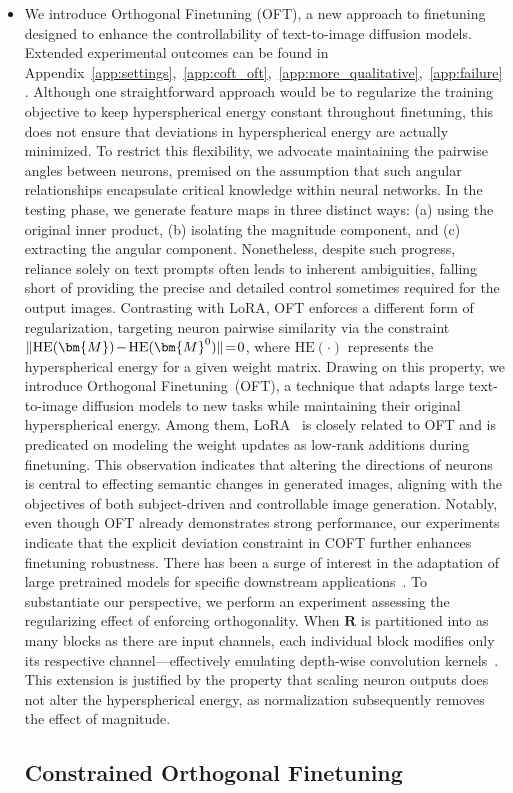 \begin{itemize}[leftmargin=*,nosep]

    \item We introduce Orthogonal Finetuning (OFT), a new approach to finetuning designed to enhance the controllability of text-to-image diffusion models. Extended experimental outcomes can be found in Appendix~\ref{app:settings},~\ref{app:coft_oft},~\ref{app:more_qualitative},~\ref{app:failure}. Although one straightforward approach would be to regularize the training objective to keep hyperspherical energy constant throughout finetuning, this does not ensure that deviations in hyperspherical energy are actually minimized. To restrict this flexibility, we advocate maintaining the pairwise angles between neurons, premised on the assumption that such angular relationships encapsulate critical knowledge within neural networks. In the testing phase, we generate feature maps in three distinct ways: (a) using the original inner product, (b) isolating the magnitude component, and (c) extracting the angular component. Nonetheless, despite such progress, reliance solely on text prompts often leads to inherent ambiguities, falling short of providing the precise and detailed control sometimes required for the output images. Contrasting with LoRA, OFT enforces a different form of regularization, targeting neuron pairwise similarity via the constraint $\thickmuskip=2mu \medmuskip=2mu \| \text{HE}(\bm{M})-\text{HE}(\bm{M}^0) \|=0$, where $\text{HE}(\cdot)$ represents the hyperspherical energy for a given weight matrix. Drawing on this property, we introduce Orthogonal Finetuning~(OFT), a technique that adapts large text-to-image diffusion models to new tasks while maintaining their original hyperspherical energy. Among them, LoRA~\cite{hulora2022} is closely related to OFT and is predicated on modeling the weight updates as low-rank additions during finetuning. This observation indicates that altering the directions of neurons is central to effecting semantic changes in generated images, aligning with the objectives of both subject-driven and controllable image generation. Notably, even though OFT already demonstrates strong performance, our experiments indicate that the explicit deviation constraint in COFT further enhances finetuning robustness. There has been a surge of interest in the adaptation of large pretrained models for specific downstream applications~\cite{devlin2018bert,brown2020language,he2022masked}. To substantiate our perspective, we perform an experiment assessing the regularizing effect of enforcing orthogonality. When $\bm{R}$ is partitioned into as many blocks as there are input channels, each individual block modifies only its respective channel—effectively emulating depth-wise convolution kernels~\cite{chollet2017xception}. This extension is justified by the property that scaling neuron outputs does not alter the hyperspherical energy, as normalization subsequently removes the effect of magnitude. \subsection{Constrained Orthogonal Finetuning}


\end{itemize}
